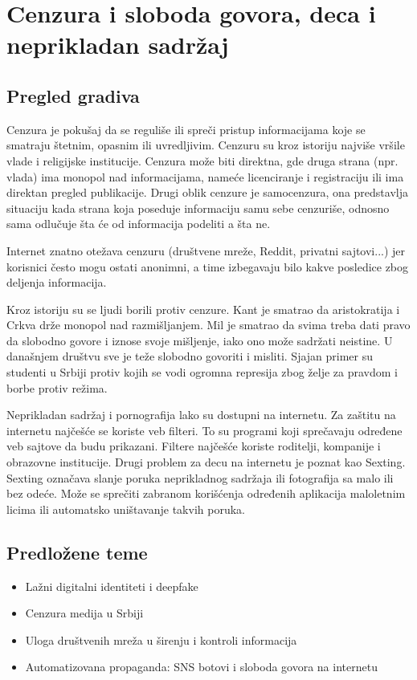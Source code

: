\documentclass[a4paper,12pt]{article}
\begin{document}
\section{Cenzura i sloboda govora, deca i neprikladan sadržaj}
\subsection{Pregled gradiva}

Cenzura je pokušaj da se reguliše ili spreči pristup informacijama koje se smatraju štetnim, opasnim ili uvredljivim. Cenzuru su kroz istoriju najviše vršile vlade i religijske institucije. Cenzura može biti direktna, gde druga strana (npr. vlada) ima monopol nad informacijama, nameće licenciranje i registraciju ili ima direktan pregled publikacije. Drugi oblik cenzure je samocenzura, ona predstavlja situaciju kada strana koja poseduje informaciju samu sebe cenzuriše, odnosno sama odlučuje šta će od informacija podeliti a šta ne. 

Internet znatno otežava cenzuru (društvene mreže, Reddit, privatni sajtovi...) jer korisnici često mogu ostati anonimni, a time izbegavaju bilo kakve posledice zbog deljenja informacija. 

Kroz istoriju su se ljudi borili protiv cenzure. Kant je smatrao da aristokratija i Crkva drže monopol nad razmišljanjem. Mil je smatrao da svima treba dati pravo da slobodno govore i iznose svoje mišljenje, iako ono može sadržati neistine. U današnjem društvu sve je teže slobodno govoriti i misliti. Sjajan primer su studenti u Srbiji protiv kojih se vodi ogromna represija zbog želje za pravdom i borbe protiv režima. 

Neprikladan sadržaj i pornografija lako su dostupni na internetu. Za zaštitu na internetu najčešće se koriste veb filteri. To su programi koji sprečavaju određene veb sajtove da budu prikazani.  Filtere najčešće koriste roditelji, kompanije i obrazovne institucije. Drugi problem za decu na internetu je poznat kao Sexting. Sexting označava slanje poruka neprikladnog sadržaja ili fotografija sa malo ili bez odeće. Može se sprečiti zabranom korišćenja određenih aplikacija maloletnim licima ili automatsko uništavanje takvih poruka. 

\subsection{Predložene teme}
\begin{itemize}
    \item Lažni digitalni identiteti i deepfake
    \item Cenzura medija u Srbiji
    \item Uloga društvenih mreža u širenju i kontroli informacija
    \item Automatizovana propaganda: SNS botovi i sloboda govora na internetu
\end{itemize}
\end{document}
